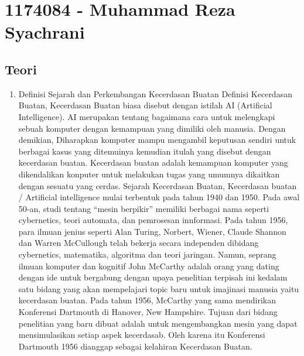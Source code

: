 \section{1174084 - Muhammad Reza Syachrani}
\subsection{Teori}
\begin{enumerate}
	\item Definisi Sejarah dan Perkembangan Kecerdasan Buatan
	\hfill\break
	Definisi Kecerdasan Buatan, Kecerdasan Buatan biasa disebut dengan istilah AI (Artificial Intelligence). AI merupakan tentang bagaimana cara untuk melengkapi sebuah komputer dengan kemampuan yang dimiliki oleh manusia. Dengan demikian, Diharapkan komputer mampu mengambil keputusan sendiri untuk berbagai kasus yang ditemuinya kemudian itulah yang disebut dengan kecerdasan buatan.  Kecerdasan buatan adalah kemampuan komputer yang dikendalikan konputer untuk melakukan tugas yang umumnya dikaitkan dengan sesuatu yang cerdas.
	\hfill\break
	Sejarah Kecerdasan Buatan, Kecerdasan buatan / Artificial intelligence mulai terbentuk pada tahun 1940 dan 1950. Pada awal 50-an, studi tentang “mesin berpikir” memiliki berbagai nama seperti cybernetics, teori automata, dan pemrosesan innformasi. Pada tahun 1956, para ilmuan jenius seperti Alan Turing, Norbert, Wiener, Claude Shannon dan Warren McCullough telah bekerja secara independen dibidang cybernetics, matematika, algoritma dan teori jaringan. Namun, seprang ilmuan komputer dan kognitif John McCarthy adalah orang yang dating dengan ide untuk bergabung dengan upaya penelitian terpisah ini kedalam satu bidang yang akan mempelajari topic baru untuk imajinasi manusia yaitu kecerdasan buatan.
    Pada tahun 1956, McCarthy yang sama mendirikan Konferensi Dartmouth di Hanover, New Hampshire. Tujuan dari bidang penelitian yang baru dibuat adalah untuk mengembangkan mesin yang dapat mensimulasikan setiap aspek kecerdasab. Oleh karena itu Konferensi Dartmouth 1956 dianggap sebagai kelahiran Kecerdasan Buatan.
    \hfill\break

\end{enumerate}
